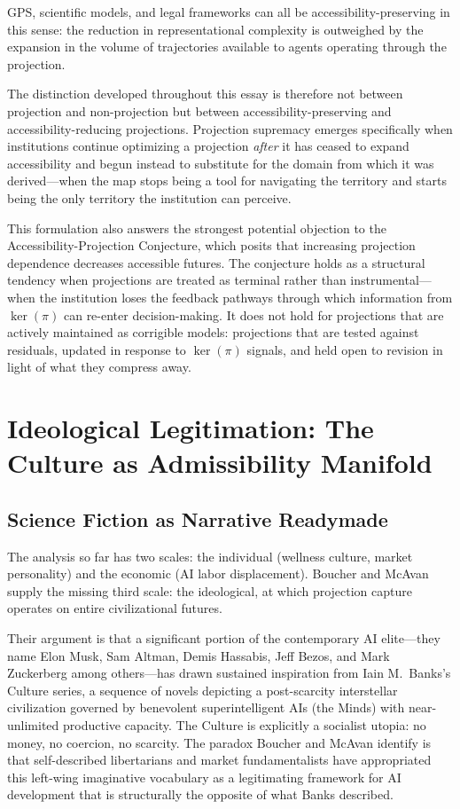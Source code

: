 \documentclass[12pt, a4paper]{article}
\theoremstyle{plain}
\theoremstyle{definition}
\theoremstyle{remark}
\begin{document}
GPS, scientific models, and legal frameworks can all be accessibility-preserving
in this sense: the reduction in representational complexity is outweighed by the
expansion in the volume of trajectories available to agents operating through the
projection.

The distinction developed throughout this essay is therefore not between projection
and non-projection but between accessibility-preserving and accessibility-reducing
projections.
Projection supremacy emerges specifically when institutions continue optimizing a
projection \emph{after} it has ceased to expand accessibility and begun instead to
substitute for the domain from which it was derived---when the map stops being a
tool for navigating the territory and starts being the only territory the institution
can perceive.

This formulation also answers the strongest potential objection to the Accessibility-Projection
Conjecture, which posits that increasing projection dependence decreases accessible
futures.
The conjecture holds as a structural tendency when projections are treated as terminal
rather than instrumental---when the institution loses the feedback pathways through
which information from $\ker(\pi)$ can re-enter decision-making.
It does not hold for projections that are actively maintained as corrigible models:
projections that are tested against residuals, updated in response to $\ker(\pi)$
signals, and held open to revision in light of what they compress away.

\section{Ideological Legitimation: The Culture as Admissibility Manifold}

\subsection{Science Fiction as Narrative Readymade}

The analysis so far has two scales: the individual (wellness culture, market personality)
and the economic (AI labor displacement).
Boucher and McAvan~\cite{BoucherMcAvan2026} supply the missing third scale: the
ideological, at which projection capture operates on entire civilizational futures.

Their argument is that a significant portion of the contemporary AI elite---they
name Elon Musk, Sam Altman, Demis Hassabis, Jeff Bezos, and Mark Zuckerberg
among others---has drawn sustained inspiration from Iain M.\ Banks's Culture series,
a sequence of novels depicting a post-scarcity interstellar civilization governed
by benevolent superintelligent AIs (the Minds) with near-unlimited productive capacity.
The Culture is explicitly a socialist utopia: no money, no coercion, no scarcity.
The paradox Boucher and McAvan identify is that self-described libertarians and
market fundamentalists have appropriated this left-wing imaginative vocabulary as
a legitimating framework for AI development that is structurally the opposite of
what Banks described.
\end{document}
